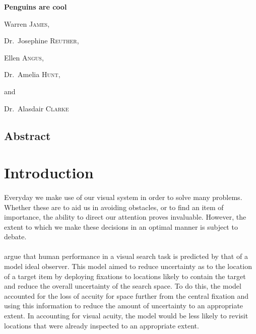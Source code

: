 \documentclass[12pt]{article}
\begin{document}
\begin{titlepage}
	\centering
	{\huge\bfseries Penguins are cool\par}
	\vspace{1cm}
	Warren \textsc{James}, \par
	Dr.~Josephine \textsc{Reuther}, \par
	Ellen \textsc{Angus}, \par
	Dr.~Amelia \textsc{Hunt},\par
	and\par
	Dr.~Alasdair \textsc{Clarke}
	\vfill
\end{titlepage}	


\newpage

\begin{center}
	\section*{Abstract}
\end{center}

\begingroup\singlespacing
\newpage
\tableofcontents
\newpage
\endgroup

\section*{Introduction}
\paragraph{} Everyday we make use of our visual system in order to solve many problems. Whether these are to aid us in avoiding obstacles, or to find an item of importance, the ability to direct our attention proves invaluable. However, the extent to which we make these decisions in an optimal manner is subject to debate. 

\paragraph{} \cite{najemnik2005optimal} argue that human performance in a visual search task is predicted by that of a model ideal observer. This model aimed to reduce uncertainty as to the location of a target item by deploying fixations to locations likely to contain the target and reduce the overall uncertainty of the search space. To do this, the model accounted for the loss of accuity for space further from the central fixation and using this information to reduce the amount of uncertainty to an appropriate extent. In accounting for visual acuity, the model would be less likely to revisit locations that were already inspected to an appropriate extent. 
\end{document}
